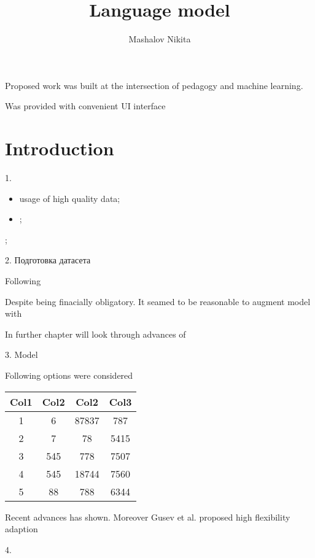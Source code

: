 \documentclass{./mipt-thesis-bs}
\title{Language model}
\author{Mashalov Nikita}
\begin{document}
Proposed work was built at the intersection of pedagogy and machine learning. 

Was provided with convenient UI interface 

\chapter{Introduction}

1. 

\begin{itemize}
    \item usage of high quality data;
    \item ;
\end{itemize};

2. Подготовка датасета


Following 

Despite being finacially obligatory. It seamed to be reasonable
to augment model with  

In further chapter will look through advances of 


3. Model 

Following options were considered


\begin{center}
\begin{tabular}{||c c c c||} 
     \hline
     Col1 & Col2 & Col2 & Col3 \\ [0.5ex] 
     \hline\hline
     1 & 6 & 87837 & 787 \\ 
     \hline
     2 & 7 & 78 & 5415 \\
     \hline
     3 & 545 & 778 & 7507 \\
     \hline
     4 & 545 & 18744 & 7560 \\
     \hline
     5 & 88 & 788 & 6344 \\ [1ex] 
     \hline
\end{tabular}
\end{center}

Recent advances has shown. Moreover Gusev et al. proposed high 
flexibility adaption


4. 
\end{document}
